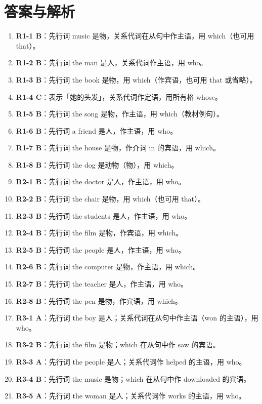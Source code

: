 \documentclass[11pt,a4paper]{ctexart}
\begin{document}
\section*{答案与解析}
\small
\begin{enumerate}[leftmargin=1.6em,itemsep=2pt]
\item \textbf{R1-1 B}：先行词 music 是物，关系代词在从句中作主语，用 which（也可用 that）。
\item \textbf{R1-2 B}：先行词 the man 是人，关系代词作主语，用 who。
\item \textbf{R1-3 B}：先行词 the book 是物，用 which（作宾语，也可用 that 或省略）。
\item \textbf{R1-4 C}：表示「她的头发」，关系代词作定语，用所有格 whose。
\item \textbf{R1-5 B}：先行词 the song 是物，作主语，用 which（教材例句）。
\item \textbf{R1-6 B}：先行词 a friend 是人，作主语，用 who。
\item \textbf{R1-7 B}：先行词 the house 是物，作介词 in 的宾语，用 which。
\item \textbf{R1-8 B}：先行词 the dog 是动物（物），用 which。
\item \textbf{R2-1 B}：先行词 the doctor 是人，作主语，用 who。
\item \textbf{R2-2 B}：先行词 the chair 是物，用 which（也可用 that）。
\item \textbf{R2-3 B}：先行词 the students 是人，作主语，用 who。
\item \textbf{R2-4 B}：先行词 the film 是物，作宾语，用 which。
\item \textbf{R2-5 B}：先行词 the people 是人，作主语，用 who。
\item \textbf{R2-6 B}：先行词 the computer 是物，作主语，用 which。
\item \textbf{R2-7 B}：先行词 the teacher 是人，作主语，用 who。
\item \textbf{R2-8 B}：先行词 the pen 是物，作宾语，用 which。
\item \textbf{R3-1 A}：先行词 the boy 是人；关系代词在从句中作主语（won 的主语），用 who。
\item \textbf{R3-2 B}：先行词 the film 是物；which 在从句中作 saw 的宾语。
\item \textbf{R3-3 A}：先行词 the people 是人；关系代词作 helped 的主语，用 who。
\item \textbf{R3-4 B}：先行词 the music 是物；which 在从句中作 downloaded 的宾语。
\item \textbf{R3-5 A}：先行词 the woman 是人；关系代词作 works 的主语，用 who。

\end{enumerate}
\end{document}

